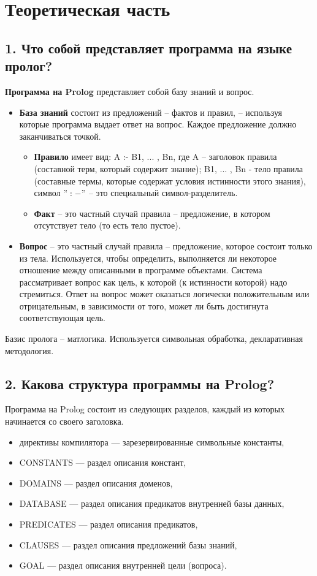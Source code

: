 \documentclass[12pt]{report}
\begin{document}
\chapter*{Теоретическая часть}

\section*{1. Что собой представляет программа на языке пролог?}


\textbf{Программа на Prolog} представляет собой базу знаний и вопрос. 

\begin{itemize}
	\item \textbf{База знаний} состоит из предложений -- фактов и правил, -- используя которые программа выдает ответ на вопрос. Каждое предложение  должно заканчиваться точкой.
	\begin{itemize}
		\item \textbf{Правило} имеет вид: A :- B1, ... , Bn, где A -- заголовок правила (составной терм, который содержит знание); B1, ... , Bn - тело правила (составные термы, которые содержат условия истинности этого знания), символ $":-"$ -- это специальный символ-разделитель.
		\item \textbf{Факт} -- это частный случай правила -- предложение, в котором отсутствует тело (то есть тело пустое).
	\end{itemize}
	\item \textbf{Вопрос} -- это частный случай правила -- предложение, которое состоит только из тела. Используется, чтобы определить, выполняется ли некоторое отношение между описанными в программе объектами. Система рассматривает вопрос как цель, к которой (к истинности которой) надо стремиться. Ответ на вопрос может оказаться логически положительным или отрицательным, в зависимости от того, может ли быть достигнута соответствующая цель.
\end{itemize}

Базис пролога -- матлогика. Используется символьная обработка,  декларативная методология.

\section*{2. Какова структура программы на Prolog?}

Программа на Prolog состоит из следующих разделов, каждый из которых начинается со своего заголовка.

\begin{itemize}
	\item директивы компилятора — зарезервированные символьные константы,
	\item CONSTANTS — раздел описания констант,
	\item DOMAINS — раздел описания доменов,
	\item DATABASE — раздел описания предикатов внутренней базы данных,
	\item PREDICATES — раздел описания предикатов,
	\item CLAUSES — раздел описания предложений базы знаний,
	\item GOAL — раздел описания внутренней цели (вопроса).
\end{itemize}
\end{document}
